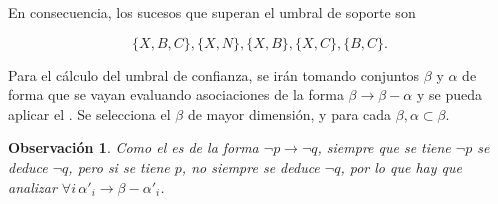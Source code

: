 \documentclass[12pt]{report}\usepackage[]{graphicx}\usepackage[dvipsnames]{xcolor}
\newtheorem{observation}{Observación}[section]
\begin{document}
			En consecuencia, los sucesos que superan el umbral de soporte son 
			
			$$
			\{X, B, C\}, \{X, N\}, \{X, B\}, \{X, C\}, \{B, C\}. 
			$$
			
			Para el cálculo del umbral de confianza, se irán tomando conjuntos $\beta$ y $\alpha$ de forma que se vayan evaluando asociaciones de la forma $\beta \rightarrow \beta - \alpha$ y se pueda aplicar el . Se selecciona el $\beta$ de mayor dimensión, y para cada $\beta, \alpha \subset \beta$. 
			
			\begin{observation}
				Como el  es de la forma $\lnot p \rightarrow \lnot q$, siempre que se tiene $\lnot p$ se deduce $\lnot q$, pero si se tiene $p$, no siempre se deduce $\lnot q$, por lo que hay que analizar $\forall i \, \alpha'_i \rightarrow \beta - \alpha'_i$.
				\label{obs:ap}
			\end{observation}
			
\end{document}
